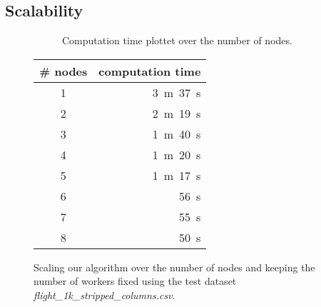\subsection{Scalability}\label{sec:evaluation:scalability}

  \begin{figure}[htbp]
    \centering
    \begin{subfigure}[c]{0.6\textwidth}
      \centering
      \caption{Computation time plottet over the number of nodes.}
      \label{fig:fig:node-scaling}
    \end{subfigure}
    \begin{subtable}[c]{0.39\textwidth}
      \centering
      \begin{tabular}{cr}
        \toprule
        \textbf{\# nodes} & \textbf{computation time} \\
        \midrule
        1 & 3~m~37~s \\
        2 & 2~m~19~s \\
        3 & 1~m~40~s \\
        4 & 1~m~20~s \\
        5 & 1~m~17~s \\
        6 & 56~s \\
        7 & 55~s \\
        8 & 50~s \\
        \bottomrule
      \end{tabular}
      \caption{Computation time for finding all \glspl{od} in the dataset.}
      \label{fig:tab:node-scaling}
    \end{subtable}
    \caption{Scaling our algorithm over the number of nodes and keeping the number of workers fixed using the test dataset \textit{flight\_1k\_stripped\_columns.csv}.}
    \label{fig:node-scaling}
  \end{figure}